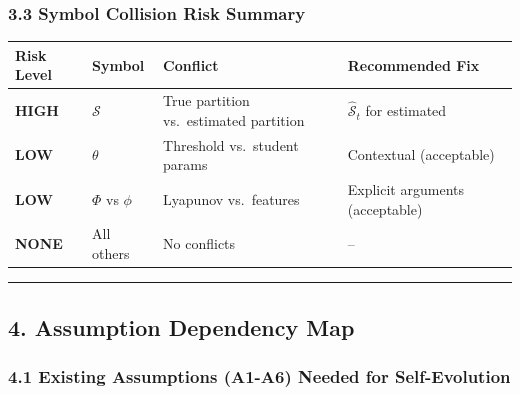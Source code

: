 \documentclass[
  12pt,
]{ctexart}
\begin{document}
\subsubsection{3.3 Symbol Collision Risk
Summary}\label{symbol-collision-risk-summary}

\begin{longtable}[]{@{}
  >{\raggedright\arraybackslash}p{}
  >{\raggedright\arraybackslash}p{}
  >{\raggedright\arraybackslash}p{}
  >{\raggedright\arraybackslash}p{}@{}}
\toprule\noalign{}
\begin{minipage}[b]{\linewidth}\raggedright
Risk Level
\end{minipage} & \begin{minipage}[b]{\linewidth}\raggedright
Symbol
\end{minipage} & \begin{minipage}[b]{\linewidth}\raggedright
Conflict
\end{minipage} & \begin{minipage}[b]{\linewidth}\raggedright
Recommended Fix
\end{minipage} \\
\midrule\noalign{}
\endhead
\bottomrule\noalign{}
\endlastfoot
\textbf{HIGH} & \(\mathcal{S}\) & True partition vs.~estimated partition
& \(\hat{\mathcal{S}}_t\) for estimated \\
\textbf{LOW} & \(\theta\) & Threshold vs.~student params & Contextual
(acceptable) \\
\textbf{LOW} & \(\Phi\) vs \(\phi\) & Lyapunov vs.~features & Explicit
arguments (acceptable) \\
\textbf{NONE} & All others & No conflicts & -- \\
\end{longtable}

\begin{center}\rule{0.5\linewidth}{0.5pt}\end{center}

\subsection{4. Assumption Dependency
Map}\label{assumption-dependency-map}

\subsubsection{4.1 Existing Assumptions (A1-A6) Needed for
Self-Evolution}\label{existing-assumptions-a1-a6-needed-for-self-evolution}
\end{document}
